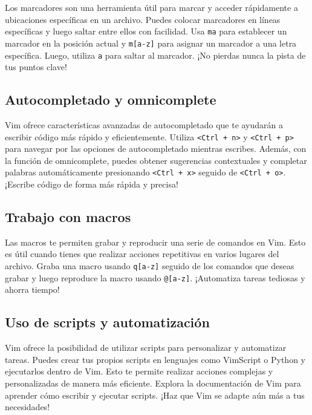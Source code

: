 \documentclass[
  doc,
  floatsintext,
  longtable,
  a4paper,
  nolmodern,
  notxfonts,
  notimes,
  12pt,
  colorlinks=true,linkcolor=blue,citecolor=blue,urlcolor=blue]{apa7}
\begin{document}
Los marcadores son una herramienta útil para marcar y acceder
rápidamente a ubicaciones específicas en un archivo. Puedes colocar
marcadores en líneas específicas y luego saltar entre ellos con
facilidad. Usa \texttt{ma} para establecer un marcador en la posición
actual y \texttt{m{[}a-z{]}} para asignar un marcador a una letra
específica. Luego, utiliza \texttt{\textquotesingle{}a} para saltar al
marcador. ¡No pierdas nunca la pista de tus puntos clave!

\subsection{Autocompletado y
omnicomplete}\label{autocompletado-y-omnicomplete}

Vim ofrece características avanzadas de autocompletado que te ayudarán a
escribir código más rápido y eficientemente. Utiliza
\texttt{\textless{}Ctrl\ +\ n\textgreater{}} y
\texttt{\textless{}Ctrl\ +\ p\textgreater{}} para navegar por las
opciones de autocompletado mientras escribes. Además, con la función de
omnicomplete, puedes obtener sugerencias contextuales y completar
palabras automáticamente presionando
\texttt{\textless{}Ctrl\ +\ x\textgreater{}} seguido de
\texttt{\textless{}Ctrl\ +\ o\textgreater{}}. ¡Escribe código de forma
más rápida y precisa!

\subsection{Trabajo con macros}\label{trabajo-con-macros}

Las macros te permiten grabar y reproducir una serie de comandos en Vim.
Esto es útil cuando tienes que realizar acciones repetitivas en varios
lugares del archivo. Graba una macro usando \texttt{q{[}a-z{]}} seguido
de los comandos que deseas grabar y luego reproduce la macro usando
\texttt{@{[}a-z{]}}. ¡Automatiza tareas tediosas y ahorra tiempo!

\subsection{Uso de scripts y
automatización}\label{uso-de-scripts-y-automatizaciuxf3n}

Vim ofrece la posibilidad de utilizar scripts para personalizar y
automatizar tareas. Puedes crear tus propios scripts en lenguajes como
VimScript o Python y ejecutarlos dentro de Vim. Esto te permite realizar
acciones complejas y personalizadas de manera más eficiente. Explora la
documentación de Vim para aprender cómo escribir y ejecutar scripts.
¡Haz que Vim se adapte aún más a tus necesidades!
\end{document}
